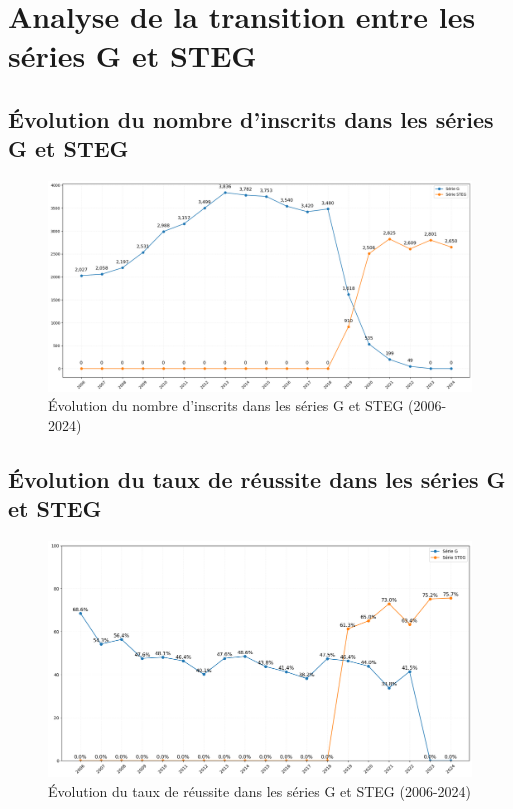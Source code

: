 \section{Analyse de la transition entre les séries G et STEG}

\subsection{Évolution du nombre d'inscrits dans les séries G et STEG}

\begin{figure}[h]
\centering
\caption{Évolution du nombre d'inscrits dans les séries G et STEG (2006-2024)}
\includegraphics[width=1\textwidth]{figure/Inscrits_bac_STEG.png}
\end{figure}

\subsection{Évolution du taux de réussite dans les séries G et STEG}

\begin{figure}[h]
\centering
\caption{Évolution du taux de réussite dans les séries G et STEG (2006-2024)}
\includegraphics[width=1\textwidth]{figure/taux_bac_STEG.png}
\end{figure}

